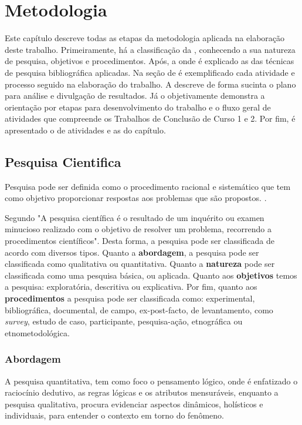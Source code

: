 \chapter[Metodologia]{Metodologia}

Este capítulo descreve todas as etapas da metodologia aplicada na elaboração deste trabalho. Primeiramente, há a classificação da , conhecendo a sua natureza de pesquisa, objetivos e procedimentos. Após, a  onde é explicado as das técnicas de pesquisa bibliográfica aplicadas. Na seção de  é exemplificado cada atividade e processo seguido na elaboração do trabalho. A  descreve de forma sucinta o plano para análise e divulgação de resultados. Já o  objetivamente demonstra a orientação por etapas para desenvolvimento do trabalho e o fluxo geral de atividades que compreende os Trabalhos de Conclusão de Curso 1 e 2. Por fim, é apresentado o  de atividades e as  do capítulo.

\section{Pesquisa Cientifica}
\label{pc}
Pesquisa pode ser definida como o procedimento racional e sistemático que tem como objetivo proporcionar respostas aos problemas que são propostos. \cite{metodologia2}.

Segundo \cite{metodologia1} "A pesquisa científica é o resultado de um inquérito ou examen minucioso realizado com o objetivo de resolver um problema, recorrendo a procedimentos científicos". Desta forma, a pesquisa pode ser classificada de acordo com diversos tipos. Quanto a \textbf{abordagem}, a pesquisa pode ser classificada como qualitativa ou quantitativa. Quanto a \textbf{natureza} pode ser classificada como uma pesquisa básica, ou aplicada. Quanto aos \textbf{objetivos} temos a pesquisa: exploratória, descritiva ou explicativa. Por fim, quanto aos \textbf{procedimentos} a pesquisa pode ser classificada como: experimental, bibliográfica, documental, de campo, ex-post-facto, de levantamento, como \textit{survey}, estudo de caso, participante, pesquisa-ação, etnográfica ou etnometodológica.

\subsection{Abordagem}

A pesquisa quantitativa, tem como foco o pensamento lógico, onde é enfatizado o raciocínio dedutivo, as regras lógicas e os atributos mensuráveis, enquanto a pesquisa qualitativa, procura evidenciar aspectos dinâmicos, holísticos e individuais, para entender o contexto em torno do fenômeno. \cite{metodologia1}


